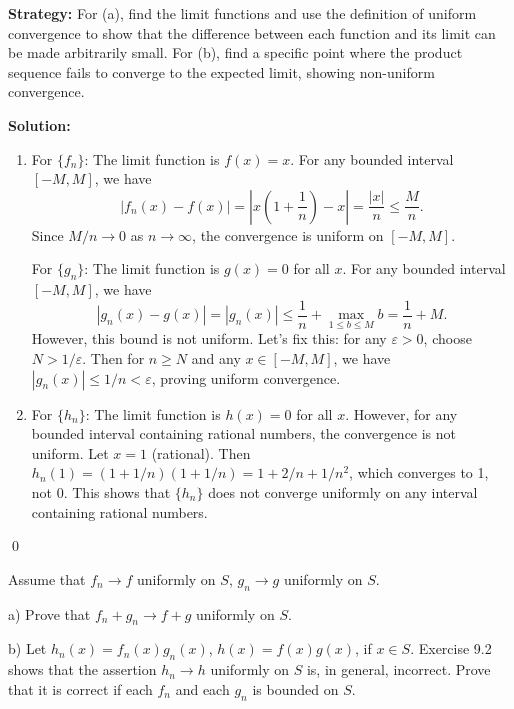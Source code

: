 \noindent\textbf{Strategy:} For (a), find the limit functions and use the definition of uniform convergence to show that the difference between each function and its limit can be made arbitrarily small. For (b), find a specific point where the product sequence fails to converge to the expected limit, showing non-uniform convergence.

\bigskip\noindent\textbf{Solution:} 
\begin{enumerate}[label=(\alph*)]
\item For \(\{f_n\}\): The limit function is \( f(x) = x \). For any bounded interval \([-M, M]\), we have
\[|f_n(x) - f(x)| = \left|x \left(1 + \frac{1}{n}\right) - x\right| = \frac{|x|}{n} \leq \frac{M}{n}.\]
Since \( M/n \to 0 \) as \( n \to \infty \), the convergence is uniform on \([-M, M]\).

For \(\{g_n\}\): The limit function is \( g(x) = 0 \) for all \( x \). For any bounded interval \([-M, M]\), we have
\[|g_n(x) - g(x)| = |g_n(x)| \leq \frac{1}{n} + \max_{1 \leq b \leq M} b = \frac{1}{n} + M.\]
However, this bound is not uniform. Let's fix this: for any \( \varepsilon > 0 \), choose \( N > 1/\varepsilon \). Then for \( n \geq N \) and any \( x \in [-M, M] \), we have \( |g_n(x)| \leq 1/n < \varepsilon \), proving uniform convergence.

\item For \(\{h_n\}\): The limit function is \( h(x) = 0 \) for all \( x \). However, for any bounded interval containing rational numbers, the convergence is not uniform. Let \( x = 1 \) (rational). Then \( h_n(1) = (1 + 1/n)(1 + 1/n) = 1 + 2/n + 1/n^2 \), which converges to 1, not 0. This shows that \(\{h_n\}\) does not converge uniformly on any interval containing rational numbers.
\end{enumerate}\qed


\begin{problembox}
\begin{problemstatement}
Assume that \( f_n \to f \) uniformly on \( S \), \( g_n \to g \) uniformly on \( S \).

a) Prove that \( f_n + g_n \to f + g \) uniformly on \( S \).

b) Let \( h_n(x) = f_n(x) g_n(x) \), \( h(x) = f(x) g(x) \), if \( x \in S \). Exercise 9.2 shows that the assertion \( h_n \to h \) uniformly on \( S \) is, in general, incorrect. Prove that it is correct if each \( f_n \) and each \( g_n \) is bounded on \( S \).
\end{problemstatement}
\end{problembox}

